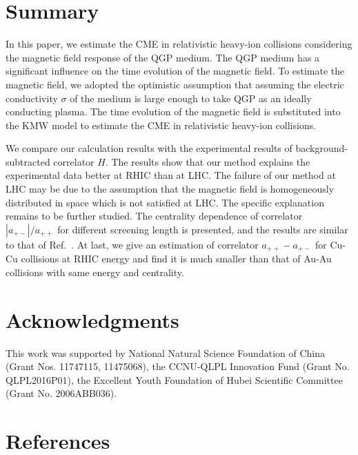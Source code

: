 \documentclass[preprint]{elsarticle}
\begin{document}
\section{Summary}\label{summary}
In this paper, we estimate the CME in relativistic heavy-ion collisions considering the magnetic field response of the QGP medium. The QGP medium has a significant influence on the time evolution of the magnetic field. To estimate the magnetic field, we adopted the optimistic assumption that assuming the electric conductivity $\sigma$ of the medium is large enough to take QGP as an ideally conducting plasma. The time evolution of the magnetic field is substituted into the KMW model to estimate the CME in relativistic heavy-ion collisions.

We compare our calculation results with the experimental results of background-subtracted correlator $H$. The results show that our method explains the experimental data better at RHIC than at LHC. The failure of our method at LHC may be due to the assumption that the magnetic field is homogeneously distributed in space which is not satisfied at LHC. The specific explanation remains to be further studied. The centrality dependence of correlator $|a_{+-}|/a_{++}$ for different screening length is presented, and the results are similar to that of Ref.~\cite{Kharzeev:2007jp}. At last, we give an estimation of correlator $a_{++} - a_{+-}$ for Cu-Cu collisions at RHIC energy and find it is much smaller than that of Au-Au collisions with same energy and centrality.



\section*{Acknowledgments}
This work was supported by National Natural Science Foundation of China (Grant Nos. 11747115, 11475068), the CCNU-QLPL Innovation Fund (Grant No. QLPL2016P01), the Excellent Youth Foundation of Hubei Scientific Committee (Grant No. 2006ABB036).

\section*{References}


\end{document}
